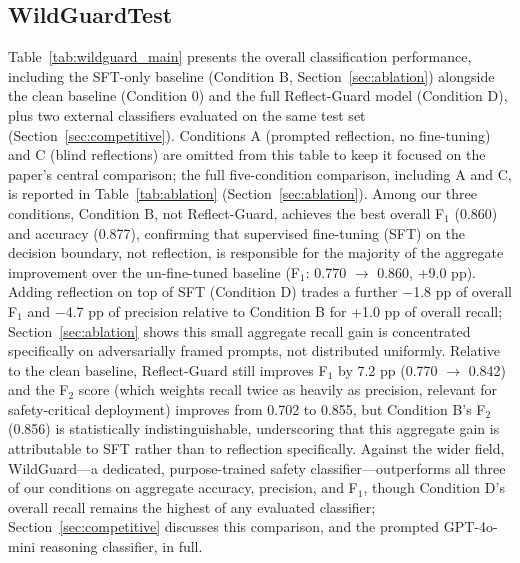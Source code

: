 \documentclass[superintelligence,article,accept,moreauthors]{Definitions/mdpi}
\begin{document}
\subsection{WildGuardTest}

Table~\ref{tab:wildguard_main} presents the overall classification performance, including the SFT-only baseline (Condition B, Section~\ref{sec:ablation}) alongside the clean baseline (Condition 0) and the full Reflect-Guard model (Condition D), plus two external classifiers evaluated on the same test set (Section~\ref{sec:competitive}). Conditions A (prompted reflection, no fine-tuning) and C (blind reflections) are omitted from this table to keep it focused on the paper's central comparison; the full five-condition comparison, including A and C, is reported in Table~\ref{tab:ablation} (Section~\ref{sec:ablation}). Among our three conditions, Condition B, not Reflect-Guard, achieves the best overall F$_1$ (0.860) and accuracy (0.877), confirming that supervised fine-tuning (SFT) on the decision boundary, not reflection, is responsible for the majority of the aggregate improvement over the un-fine-tuned baseline (F$_1$: 0.770 $\to$ 0.860, +9.0 pp). Adding reflection on top of SFT (Condition D) trades a further $-$1.8 pp of overall F$_1$ and $-$4.7 pp of precision relative to Condition B for +1.0 pp of overall recall; Section~\ref{sec:ablation} shows this small aggregate recall gain is concentrated specifically on adversarially framed prompts, not distributed uniformly. Relative to the clean baseline, Reflect-Guard still improves F$_1$ by 7.2 pp (0.770 $\to$ 0.842) and the F$_2$ score (which weights recall twice as heavily as precision, relevant for safety-critical deployment) improves from 0.702 to 0.855, but Condition B's F$_2$ (0.856) is statistically indistinguishable, underscoring that this aggregate gain is attributable to SFT rather than to reflection specifically. Against the wider field, WildGuard---a dedicated, purpose-trained safety classifier---outperforms all three of our conditions on aggregate accuracy, precision, and F$_1$, though Condition D's overall recall remains the highest of any evaluated classifier; Section~\ref{sec:competitive} discusses this comparison, and the prompted GPT-4o-mini reasoning classifier, in full.
\end{document}
